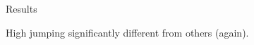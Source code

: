 \documentclass[unknownkeysallowed]{beamer}\usepackage[]{graphicx}\usepackage[]{color}
\begin{document}
\begin{frame}[fragile]{Results}
  
  
    High jumping significantly different from others (again).
  
\end{frame}
%
%
%
%
%  
%
%  
%
%
%
%
%
%
%
%
%
%
%
%
%
%
\end{document}
